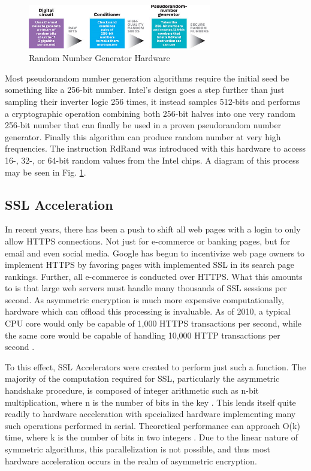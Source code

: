 \documentclass[journal]{IEEEtran}
\begin{document}
\begin{figure}[htbp]
	\centering
	\includegraphics[width=8cm,keepaspectratio]{img/rngProcess.png}
	\caption{Random Number Generator Hardware \cite{IEEERNG} }
	\label{rngFig}
\end{figure}



Most pseudorandom number generation algorithms require the initial seed be something like a 256-bit number.  Intel's design goes a step further than just sampling their inverter logic 256 times, it instead samples 512-bits and performs a cryptographic operation combining both 256-bit halves into one very random 256-bit number that can finally be used in a proven pseudorandom number generator.  Finally this algorithm can produce random number at very high frequencies.  The instruction RdRand was introduced with this hardware to access 16-, 32-, or 64-bit random values from the Intel chips.  A diagram of this process may be seen in Fig. \ref{rngFig}.

\subsection{SSL Acceleration}

In recent years, there has been a push to shift all web pages with a login to only allow HTTPS connections.  Not just for e-commerce or banking pages, but for email and even social media.  Google has begun to incentivize web page owners to implement HTTPS \cite{httpsPush} by favoring pages with implemented SSL in its search page rankings.  Further, all e-commerce is conducted over HTTPS.  What this amounts to is that large web servers must handle many thousands of SSL sessions per second.  As asymmetric encryption is much more expensive computationally, hardware which can offload this processing is invaluable.  As of 2010, a typical CPU core would only be capable of 1,000 HTTPS transactions per second, while the same core would be capable of handling 10,000 HTTP transactions per second \cite{sslGPU}.

To this effect, SSL Accelerators were created to perform just such a function.  The majority of the computation required for SSL, particularly the asymmetric handshake procedure, is composed of integer arithmetic such as n-bit multiplication, where n is the number of bits in the key \cite{sslGPU}.  This lends itself quite readily to hardware acceleration with specialized hardware implementing many such operations performed in serial.  Theoretical performance can approach O(k) time, where k is the number of bits in two integers \cite{sslGPU}.  Due to the linear nature of symmetric algorithms, this parallelization is not possible, and thus most hardware acceleration occurs in the realm of asymmetric encryption.
\end{document}
